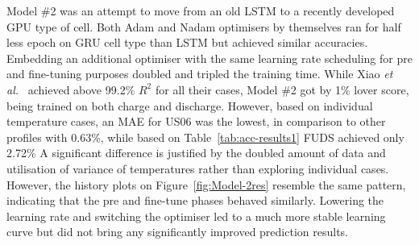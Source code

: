 %
%
Model \#2 was an attempt to move from an old LSTM to a recently developed GPU type of cell.
Both Adam and Nadam optimisers by themselves ran for half less epoch on GRU cell type than LSTM but achieved similar accuracies.
Embedding an additional optimiser with the same learning rate scheduling for pre and fine-tuning purposes doubled and tripled the training time.
While Xiao \textit{et al.}~\cite{xiao_accurate_2019} achieved above 99.2\% $R^2$ for all their cases, Model \#2 got by 1\% lover score, being trained on both charge and discharge.
However, based on individual temperature cases, an MAE for US06 was the lowest, in comparison to other profiles with 0.63\%, while based on Table~\ref{tab:acc-results1} FUDS achieved only 2.72\%
A significant difference is justified by the doubled amount of data and utilisation of variance of temperatures rather than exploring individual cases.
However, the history plots on Figure~\ref{fig:Model-2res} resemble the same pattern, indicating that the pre and fine-tune phases behaved similarly.
Lowering the learning rate and switching the optimiser led to a much more stable learning curve but did not bring any significantly improved prediction results.

